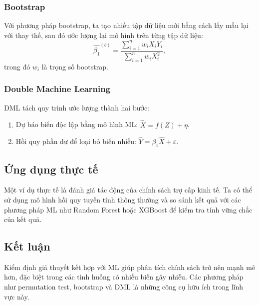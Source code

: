 \subsubsection{Bootstrap}
Với phương pháp bootstrap, ta tạo nhiều tập dữ liệu mới bằng cách lấy mẫu lại với thay thế, sau đó ước lượng lại mô hình trên từng tập dữ liệu:
\begin{equation}
    \hat{\beta_1}^{(b)} = \frac{\sum_{i=1}^{n} w_i X_i Y_i}{\sum_{i=1}^{n} w_i X_i^2},
\end{equation}
trong đó $w_i$ là trọng số bootstrap.

\subsubsection{Double Machine Learning}
DML tách quy trình ước lượng thành hai bước:
\begin{enumerate}
    \item Dự báo biến độc lập bằng mô hình ML: $\hat{X} = f(Z) + \eta$.
    \item Hồi quy phần dư để loại bỏ biến nhiễu: $\hat{Y} = \beta_1 \hat{X} + \varepsilon$.
\end{enumerate}

\subsection{Ứng dụng thực tế}
Một ví dụ thực tế là đánh giá tác động của chính sách trợ cấp kinh tế. Ta có thể sử dụng mô hình hồi quy tuyến tính thông thường và so sánh kết quả với các phương pháp ML như Random Forest hoặc XGBoost để kiểm tra tính vững chắc của kết quả.

\subsection{Kết luận}
Kiểm định giả thuyết kết hợp với ML giúp phân tích chính sách trở nên mạnh mẽ hơn, đặc biệt trong các tình huống có nhiều biến gây nhiễu. Các phương pháp như permutation test, bootstrap và DML là những công cụ hữu ích trong lĩnh vực này.
